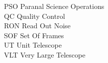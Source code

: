 \begin{tabbing}
PSO         \> Paranal Science Operations \\
QC          \> Quality Control \\
RON        \> Read Out Noise \\
SOF        \> Set Of Frames \\
UT         \> Unit Telescope \\
VLT        \> Very Large Telescope \\
\end{tabbing}

